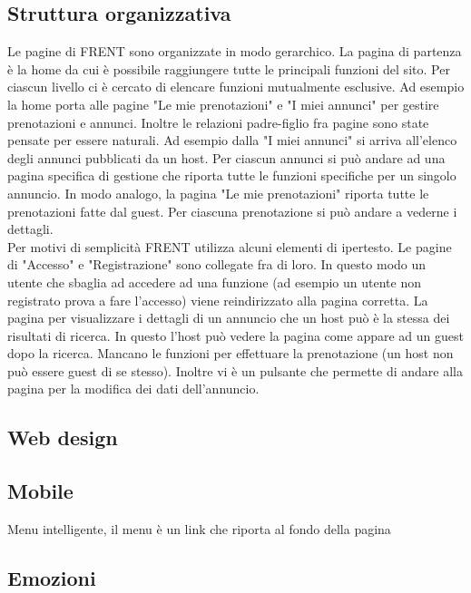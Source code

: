 \documentclass[1_relazione.tex]{subfiles}
\begin{document}
\subsection{Struttura organizzativa}
Le pagine di FRENT sono organizzate in modo gerarchico. La pagina di partenza è la home da cui è possibile raggiungere tutte le principali funzioni del sito. Per ciascun livello ci è cercato di elencare funzioni mutualmente esclusive. Ad esempio la home porta alle pagine "Le mie prenotazioni" e "I miei annunci" per gestire prenotazioni e annunci. Inoltre le relazioni padre-figlio fra pagine sono state pensate per essere naturali. Ad esempio dalla "I miei annunci" si arriva all'elenco degli annunci pubblicati da un host. Per ciascun annunci si può andare ad una pagina specifica di gestione che riporta tutte le funzioni specifiche per un singolo annuncio. In modo analogo, la pagina "Le mie prenotazioni" riporta tutte le prenotazioni fatte dal guest. Per ciascuna prenotazione si può andare a vederne i dettagli. \\
Per motivi di semplicità FRENT utilizza alcuni elementi di ipertesto. Le pagine di "Accesso" e "Registrazione" sono collegate fra di loro. In questo modo un utente che sbaglia ad accedere ad una funzione (ad esempio un utente non registrato prova a fare l'accesso) viene reindirizzato alla pagina corretta. 
La pagina per visualizzare i dettagli di un annuncio che un host può è la stessa dei risultati di ricerca. In questo l'host può vedere la pagina come appare ad un guest dopo la ricerca. Mancano le funzioni per effettuare la prenotazione (un host non può essere guest di se stesso). Inoltre vi è un pulsante che permette di andare alla pagina per la modifica dei dati dell'annuncio.

\subsection{Web design}


\subsection{Mobile}
Menu intelligente, il menu è un link che riporta al fondo della pagina 

\subsection{Emozioni}
\end{document}
